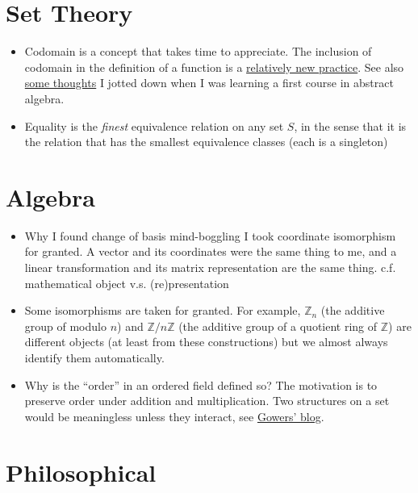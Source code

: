 \documentclass[a4paper]{article}
\begin{document}
\maketitle
\tableofcontents

\section{Set Theory}

\begin{itemize}
\item Codomain is a concept that takes time to appreciate. The inclusion of codomain in the definition of a function is a \href{https://math.stackexchange.com/a/65418/68241}{relatively new practice}. See also \hyperref[sec:homomorphism]{some thoughts} I jotted down when I was learning a first course in abstract algebra.
\item Equality is the \emph{finest} equivalence relation on any set $S$, in the sense that it is the relation that has the smallest equivalence classes (each is a singleton)
  
\end{itemize}

\section{Algebra}

\begin{itemize}
\item Why I found change of basis mind-boggling
  I took coordinate isomorphism for granted. A vector and its coordinates were the same thing to me, and a linear transformation and its matrix representation are the same thing. c.f. mathematical object v.s. (re)presentation
\item Some isomorphisms are taken for granted. For example, $\mathbb{Z}_n$ (the additive group of modulo $n$) and $\mathbb{Z}/n\mathbb{Z}$ (the additive group of a quotient ring of $\mathbb{Z}$) are different objects (at least from these constructions) but we almost always identify them automatically.
  \item Why is the ``order'' in an ordered field defined so? The motivation is to preserve order under addition and multiplication. Two structures on a set would be meaningless unless they interact, see \href{https://gowers.wordpress.com/2014/01/11/introduction-to-cambridge-ia-analysis-i-2014/}{Gowers' blog}.
\end{itemize}

\section{Philosophical}
\end{document}
